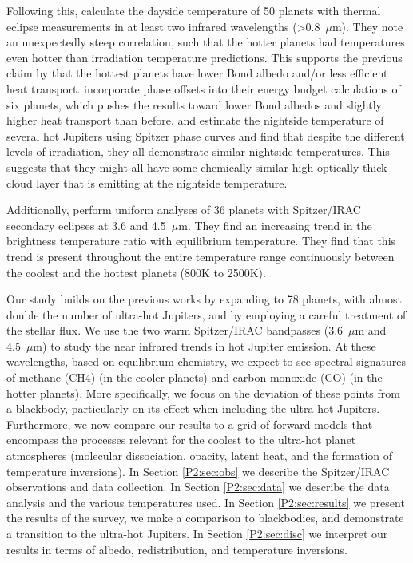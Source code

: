 Following this, \citet{Schwartz2015} calculate the dayside temperature of 50 planets with thermal eclipse measurements in at least two infrared wavelengths (>0.8~$\mu$m). They note an unexpectedly steep correlation, such that the hotter planets had temperatures even hotter than irradiation temperature predictions. This supports the previous claim by \citet{Cowan2011b} that the hottest planets have lower Bond albedo and/or less efficient heat transport.
\citet{Schwartz2017} incorporate phase offsets into their energy budget calculations of six planets, which pushes the results toward lower Bond albedos and slightly higher heat transport than before. \citet{Keating2019} and \citet{Beatty2019} estimate the nightside temperature of several hot Jupiters using Spitzer phase curves and find that despite the different levels of irradiation, they all demonstrate similar nightside temperatures. This suggests that they might all have some chemically similar high optically thick cloud layer that is emitting at the nightside temperature.

Additionally, \citet{Garhart2020} perform  uniform analyses of 36 planets with Spitzer/IRAC secondary eclipses at 3.6 and 4.5~$\mu$m. They find an increasing trend in the brightness temperature ratio with equilibrium temperature. They find that this trend is present throughout the entire temperature range continuously between the coolest and the hottest planets (800K to 2500K).

Our study builds on the previous works by expanding to 78 planets, with almost double the number of ultra-hot Jupiters, and by employing a careful treatment of the stellar flux. We use the two warm Spitzer/IRAC bandpasses (3.6~$\mu$m and 4.5~$\mu$m) \citep{Fazio2004, Werner2004} to study the near infrared trends in hot Jupiter emission. At these wavelengths, based on equilibrium chemistry, we expect to see spectral signatures of methane (CH4) (in the cooler planets) and carbon monoxide (CO) (in the hotter planets).
More specifically, we focus on the deviation of these points from a blackbody, particularly on its effect when including the ultra-hot Jupiters. Furthermore, we now compare our results to a grid of forward models that encompass the processes relevant for the coolest to the ultra-hot planet atmospheres (molecular dissociation,  opacity, latent heat, and the formation of temperature inversions). In Section \ref{P2:sec:obs} we describe the Spitzer/IRAC observations and data collection. In Section \ref{P2:sec:data} we describe the data analysis and the various temperatures used. In Section \ref{P2:sec:results} we present the results of the survey, we make a comparison to blackbodies, and demonstrate a transition to the ultra-hot Jupiters. In Section \ref{P2:sec:disc} we interpret our results in terms of albedo, redistribution, and temperature inversions.

